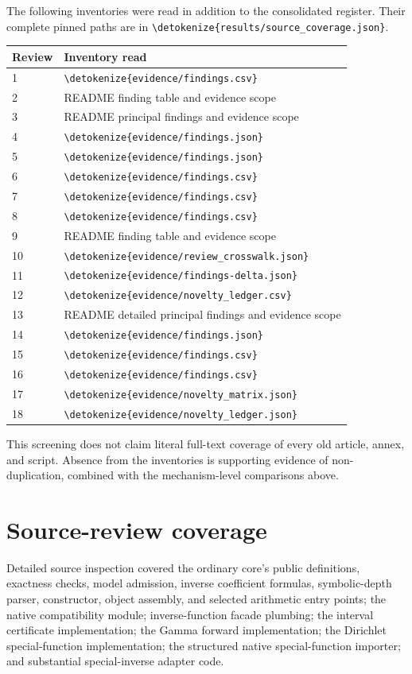 \documentclass[11pt,a4paper]{article}
\newcommand{\wl}[1]{\texttt{\expandafter\nolinkurl\expandafter{\detokenize{#1}}}}
\begin{document}
The following inventories were read in addition to the consolidated register.
Their complete pinned paths are in \wl{results/source_coverage.json}.
\begin{longtable}{@{}p{}p{}@{}}
\toprule
Review & Inventory read\\
\midrule
\endhead
1 & \wl{evidence/findings.csv}\\
2 & README finding table and evidence scope\\
3 & README principal findings and evidence scope\\
4 & \wl{evidence/findings.json}\\
5 & \wl{evidence/findings.json}\\
6 & \wl{evidence/findings.csv}\\
7 & \wl{evidence/findings.csv}\\
8 & \wl{evidence/findings.csv}\\
9 & README finding table and evidence scope\\
10 & \wl{evidence/review_crosswalk.json}\\
11 & \wl{evidence/findings-delta.json}\\
12 & \wl{evidence/novelty_ledger.csv}\\
13 & README detailed principal findings and evidence scope\\
14 & \wl{evidence/findings.json}\\
15 & \wl{evidence/findings.csv}\\
16 & \wl{evidence/findings.csv}\\
17 & \wl{evidence/novelty_matrix.json}\\
18 & \wl{evidence/novelty_ledger.json}\\
\bottomrule
\end{longtable}
This screening does not claim literal full-text coverage of every old article,
annex, and script. Absence from the inventories is supporting evidence of
non-duplication, combined with the mechanism-level comparisons above.

\section{Source-review coverage}

Detailed source inspection covered the ordinary core's public definitions,
exactness checks, model admission, inverse coefficient formulas, symbolic-depth
parser, constructor, object assembly, and selected arithmetic entry points;
the native compatibility module; inverse-function facade plumbing; the interval
certificate implementation; the Gamma forward implementation; the Dirichlet
special-function implementation; the structured native special-function importer;
and substantial special-inverse adapter code.\cite{core,native,inverseexpr,arith,cert,gamma,dirichlet,nativespecial,special}
\end{document}
